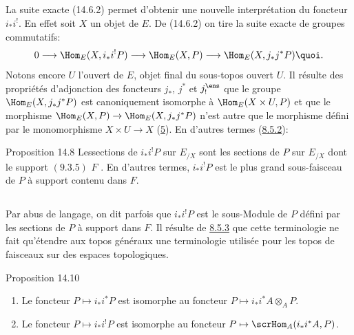 \documentclass[10pt]{../fichiers-configuration-latex/smfart}
\begin{document}
\subsection{}
La suite exacte (14.6.2) permet d'obtenir une nouvelle
interprétation du foncteur $i_{\ast}i^{!}$. En effet soit $X$ un
objet de $E$. De (14.6.2) on tire la suite exacte de groupes
commutatifs:
$$
0\longrightarrow \Hom_E(X,i_{\ast}i^{!}P)\longrightarrow
\Hom_E(X,P)\longrightarrow \Hom_E(X,j_{\ast}j^{\ast}P){\quoi}.
$$
Notons encore $U$ l'ouvert de $E$, objet final du sous-topos ouvert
$U$. Il résulte des propriétés d'adjonction des foncteurs
$j_{\ast}$, $j^{\ast}$ et $j_{!}^{\ens}$ que le groupe
$\Hom_E(X,j_{\ast}j^{\ast}P)$ est canoniquement isomorphe à
$\Hom_E(X\times U,P)$ et que le morphisme $\Hom_E(X,P)\rightarrow
\Hom_E(X,j_{\ast}j^{\ast}P)$ n'est autre que le morphisme défini par
le monomorphisme $X\times U\rightarrow X$ (\hyperref[IV.sec5]{5}). En
d'autres termes (\hyperref[IV.subsubsec8.5.2]{8.5.2}):

\begin{enonce*}{Proposition 14.8}
Les\pageoriginale sections de $i_{\ast}i^{!}P$ sur $E_{/X}$ sont les
sections de $P$ sur $E_{/X}$ dont le support
$(\hyperref[IV.subsubsec9.3.5]{9.3.5})$  $F$ . En
d'autres termes, $i_{\ast}i^{!}P$ est le plus grand sous-faisceau de
$P$ à support contenu dans $F$.
\end{enonce*}

\setcounter{subsection}{8}
\subsection{}
Par abus de langage, on dit parfois que $i_{\ast}i^{!}P$ est le
sous-Module de $P$ défini par les sections de $P$ à support dans
$F$. Il résulte de \hyperref[IV.rem8.5.3]{8.5.3} que cette terminologie ne fait
qu'étendre aux topos généraux une terminologie
utilisée pour les
topos de faisceaux sur des espaces topologiques.

\begin{enonce*}{Proposition 14.10}
\begin{enumerate}
\renewcommand{\labelenumi}{\theenumi)}
\item Le foncteur $P\mapsto i_{\ast}i^{\ast}P$ est isomorphe au
foncteur $P\mapsto i_{\ast}i^{\ast}A\otimes_A P$.

\item Le foncteur $P\mapsto i_{\ast}i^{!}P$ est isomorphe au foncteur
$P\mapsto \scrHom_A(i_{\ast}i^{\ast}A,P)$.
\end{enumerate}
\end{enonce*}
\end{document}
